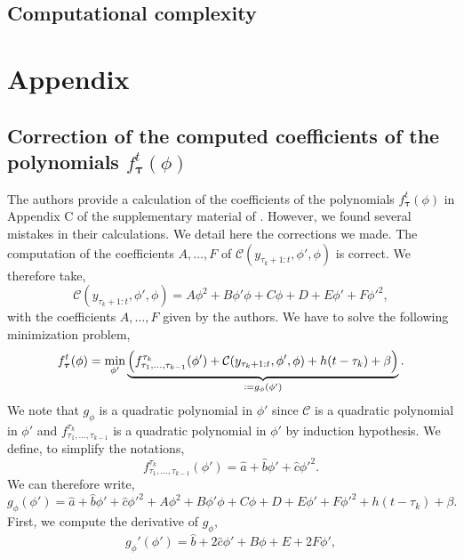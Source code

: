 \documentclass[11pt]{article}
\newcommand{\jump}{\newline\newline}
\begin{document}
\subsection{Computational complexity}

\clearpage
\section{Appendix}
\subsection{Correction of the computed coefficients of the polynomials $f^t_{\boldsymbol{\tau}}(\phi)$}
The authors provide a calculation of the coefficients of the polynomials $f^t_{\boldsymbol{\tau}}(\phi)$ in Appendix C of the supplementary material of \cite{mainarticle}. However, we found several mistakes in their calculations. We detail here the corrections we made.
\jump
The computation of the coefficients $A,\dots,F$ of $\mathcal{C}(y_{\tau_k+1:t},\phi',\phi)$ is correct. We therefore take,
\begin{equation}
    \mathcal{C}(y_{\tau_k+1:t},\phi',\phi) = A\phi^2+B\phi'\phi + C\phi + D + E\phi'+F{\phi'}^2,
\end{equation}
with the coefficients $A,\dots,F$ given by the authors.
\jump
We have to solve the following minimization problem,
\begin{equation}
    f_{\boldsymbol{\tau}}^t(\phi) = \min_{\phi'}\underbrace{\left(f^{\tau_k}_{\tau_1,\dots,\tau_{k-1}}(\phi')+\mathcal{C}(y_{\tau_k+1:t},\phi',\phi)+h(t-\tau_k)+\beta\right)}_{\vcentcolon = g_\phi(\phi')}.
\end{equation}
We note that $g_\phi$ is a quadratic polynomial in $\phi'$ since $\mathcal{C}$ is a quadratic polynomial in $\phi'$ and $f^{\tau_k}_{\tau_1,\dots,\tau_{k-1}}$ is a quadratic polynomial in $\phi'$ by induction hypothesis. We define, to simplify the notations,
\begin{equation*}
    f^{\tau_k}_{\tau_1,\dots,\tau_{k-1}}(\phi') = \hat{a} + \hat{b}\phi' + \hat{c}{\phi'}^2.
\end{equation*}
We can therefore write,
\begin{equation*}
    g_\phi(\phi') = \hat{a} + \hat{b}\phi' + \hat{c}{\phi'}^2 + A\phi^2+B\phi'\phi + C\phi + D + E\phi'+F{\phi'}^2 + h(t-\tau_k)+\beta.
\end{equation*}
First, we compute the derivative of $g_\phi$,
\begin{equation*}
    g_\phi'(\phi') = \hat{b} + 2\hat{c}\phi' + B\phi + E + 2F\phi',
\end{equation*}
\end{document}
